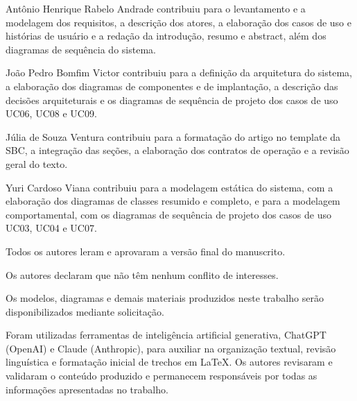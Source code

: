 \documentclass[portuguese]{sbcreviews-2025}
\begin{document}










\begin{declarations}

\begin{contributions}
Antônio Henrique Rabelo Andrade contribuiu para o levantamento e a modelagem dos requisitos, a descrição dos atores, a elaboração dos casos de uso e histórias de usuário e a redação da introdução, resumo e abstract, além dos diagramas de sequência do sistema.

João Pedro Bomfim Victor contribuiu para a definição da arquitetura do sistema, a elaboração dos diagramas de componentes e de implantação, a descrição das decisões arquiteturais e os diagramas de sequência de projeto dos casos de uso UC06, UC08 e UC09.

Júlia de Souza Ventura contribuiu para a formatação do artigo no template da SBC, a integração das seções, a elaboração dos contratos de operação e a revisão geral do texto.

Yuri Cardoso Viana contribuiu para a modelagem estática do sistema, com a elaboração dos diagramas de classes resumido e completo, e para a modelagem comportamental, com os diagramas de sequência de projeto dos casos de uso UC03, UC04 e UC07.

Todos os autores leram e aprovaram a versão final do manuscrito.
\end{contributions}

\begin{interests}
Os autores declaram que não têm nenhum conflito de interesses.
\end{interests}

\begin{materials}
Os modelos, diagramas e demais materiais produzidos neste trabalho serão disponibilizados mediante solicitação.
\end{materials}

\begin{aitools}
Foram utilizadas ferramentas de inteligência artificial generativa, ChatGPT (OpenAI) e Claude (Anthropic), para auxiliar na organização textual, revisão linguística e formatação inicial de trechos em LaTeX. Os autores revisaram e validaram o conteúdo produzido e permanecem responsáveis por todas as informações apresentadas no trabalho.
\end{aitools}


\end{declarations}
\end{document}
